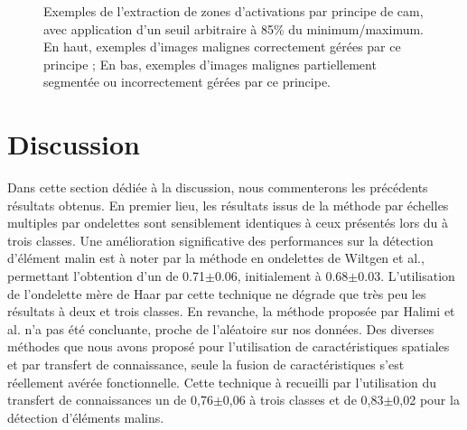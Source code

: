 \begin{figure}[H]
    \caption{Exemples de l'extraction de zones d'activations par principe de \gls{cam}, avec application d'un seuil arbitraire à 85\% du minimum/maximum. En haut, exemples d'images malignes correctement gérées par ce principe ; En bas, exemples d'images malignes partiellement segmentée ou incorrectement gérées par ce principe.}
    \label{fig:example_image_improvement_ft}
\end{figure}\par
\clearpage

\section{Discussion}
Dans cette section dédiée à la discussion, nous commenterons les précédents résultats obtenus. En premier lieu, les résultats issus de la méthode par échelles multiples par ondelettes sont sensiblement identiques à ceux présentés lors du  à trois classes. Une amélioration significative des performances sur la détection d'élément malin est à noter par la méthode en ondelettes de Wiltgen et al., permettant l'obtention d'un \fscore{} de 0.71$\pm$0.06, initialement à 0.68$\pm$0.03. L'utilisation de l'ondelette mère de Haar par cette technique ne dégrade que très peu les résultats à deux et trois classes. En revanche, la méthode proposée par Halimi et al. n'a pas été concluante, proche de l'aléatoire sur nos données. Des diverses méthodes que nous avons proposé pour l'utilisation de caractéristiques spatiales et par transfert de connaissance, seule la fusion de caractéristiques s'est réellement avérée fonctionnelle. Cette technique à recueilli par l'utilisation du transfert de connaissances un \fscore{} de 0,76$\pm$0,06 à trois classes et de 0,83$\pm$0,02 pour la détection d'éléments malins.\par

